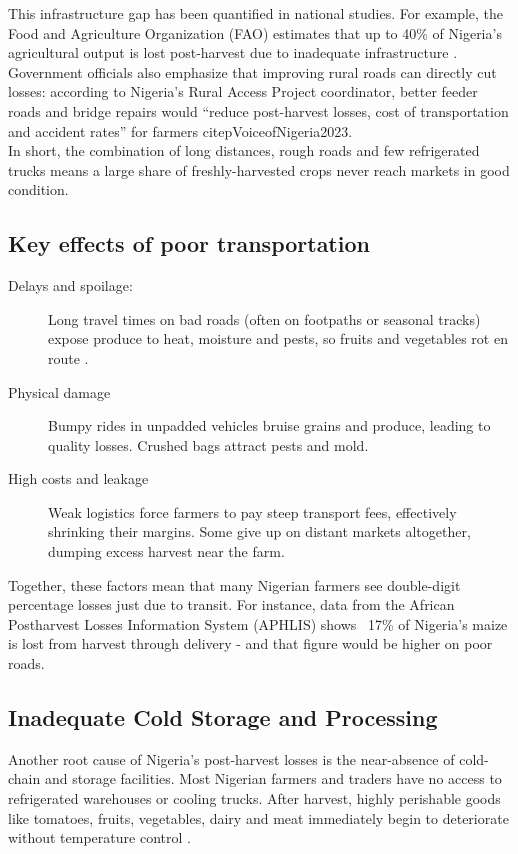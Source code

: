 {This infrastructure gap has been quantified in national studies. For example, the Food and Agriculture Organization (FAO) estimates that up to 40\% of Nigeria’s agricultural output is lost post-harvest due to inadequate infrastructure \citep{PinnacleTimes2024}. Government officials also emphasize that improving rural roads can directly cut losses: according to Nigeria’s Rural Access Project coordinator, better feeder roads and bridge repairs would “reduce post-harvest losses, cost of transportation and accident rates” for farmers citep{VoiceofNigeria2023}.
\\

In short, the combination of long distances, rough roads and few refrigerated trucks means a large share of freshly-harvested crops never reach markets in good condition.

\subsection{Key effects of poor transportation}

\begin{description}
    \item[Delays and spoilage:] Long travel times on bad roads (often on footpaths or seasonal tracks) expose produce to heat, moisture and pests, so fruits and vegetables rot en route \citep{Ikegwuonu2018}.
    
    \item[Physical damage] Bumpy rides in unpadded vehicles bruise grains and produce, leading to quality losses. Crushed bags attract pests and mold.
    
    \item[High costs and leakage] Weak logistics force farmers to pay steep transport fees, effectively shrinking their margins. Some give up on distant markets altogether, dumping excess harvest near the farm.
\end{description}


Together, these factors mean that many Nigerian farmers see double-digit percentage losses just due to transit. For instance, data from the African Postharvest Losses Information System (APHLIS) shows ~17\% of Nigeria's maize is lost from harvest through delivery \citet{APHLIS}- and that figure would be higher on poor roads.


\subsection{Inadequate Cold Storage and Processing}
Another root cause of Nigeria’s post-harvest losses is the near-absence of cold-chain and storage facilities. Most Nigerian farmers and traders have no access to refrigerated warehouses or cooling trucks. After harvest, highly perishable goods like tomatoes, fruits, vegetables, dairy and meat immediately begin to deteriorate without temperature control \citep{OTACCWA2025}.
\vspace{\myvspace}

}
